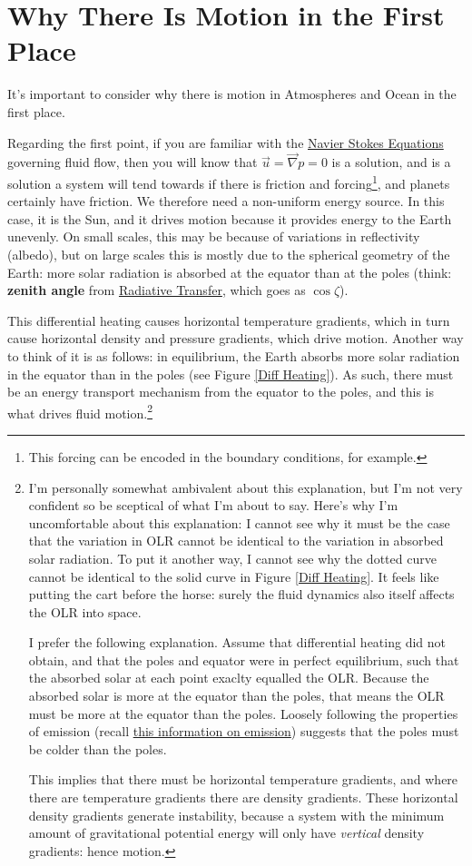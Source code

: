 \section{Why There Is Motion in the First Place}

It's important to consider why there is motion in Atmospheres and Ocean in the first place.

Regarding the first point, if you are familiar with the \hyperref[Navier Stokes]{Navier Stokes Equations} governing fluid flow, then you will know that $\vec{u}=\vec{\nabla}p=0$ is a solution, and is a solution a system will tend towards if there is friction and forcing\footnote{This forcing can be encoded in the boundary conditions, for example.}, and planets certainly have friction. We therefore need a non-uniform energy source. In this case, it is the Sun, and it drives motion because it provides energy to the Earth unevenly. On small scales, this may be because of variations in reflectivity (albedo), but on large scales this is mostly due to the spherical geometry of the Earth: more solar radiation is absorbed at the equator than at the poles (think: \textbf{zenith angle} from \hyperref[Radiative Transfer]{Radiative Transfer}, which goes as $\cos\zeta$).

This differential heating causes horizontal temperature gradients, which in turn cause horizontal density and pressure gradients, which drive motion. Another way to think of it is as follows: in equilibrium, the Earth absorbs more solar radiation in the equator than in the poles (see Figure \ref{Diff Heating}). As such, there must be an energy transport mechanism from the equator to the poles, and this is what drives fluid motion.\footnote{
    I'm personally somewhat ambivalent about this explanation, but I'm not very confident so be sceptical of what I'm about to say. Here's why I'm uncomfortable about this explanation: I cannot see why it must be the case that the variation in OLR cannot be identical to the variation in absorbed solar radiation. To put it another way, I cannot see why the dotted curve cannot be identical to the solid curve in Figure \ref{Diff Heating}. It feels like putting the cart before the horse: surely the fluid dynamics also itself affects the OLR into space.

    I prefer the following explanation. Assume that differential heating did not obtain, and that the poles and equator were in perfect equilibrium, such that the absorbed solar at each point exaclty equalled the OLR. Because the absorbed solar is more at the equator than the poles, that means the OLR must be more at the equator than the poles. Loosely following the properties of emission (recall  \hyperref[Emission Box]{this information on emission}) suggests that the poles must be colder than the poles. 

    This implies that there must be horizontal temperature gradients, and where there are temperature gradients there are density gradients. These horizontal density gradients generate instability, because a system with the minimum amount of gravitational potential energy will only have \textit{vertical} density gradients: hence motion.
}

